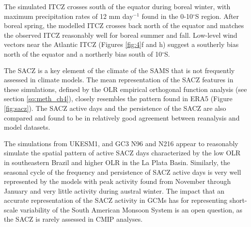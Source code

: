 The simulated ITCZ  crosses south of the equator during boreal winter, with maximum precipitation rates of 12 mm day$^{-1}$ found in the 0-10$^\circ$S region.
After boreal spring, the modelled ITCZ crosses back north of the equator and matches the observed ITCZ reasonably well for boreal summer and fall.
Low-level wind vectors near the Atlantic ITCZ (Figures \ref{fig:4}f and h) suggest a southerly bias north of the equator and a northerly bias south of 10$^\circ$S.


 The SACZ is a key element of the climate of the SAMS \citep{carvalho2004,jorgetti2014,van2015dynamical,zilli2019} that is not frequently assessed in climate models.  
 The mean representation of the SACZ features in these simulations, defined by the OLR empirical orthogonal function analysis (see section \ref{sq:meth_ch4}),  closely resembles the pattern found in ERA5 (Figure \ref{fig:sacz}). The SACZ active days and the persistence of the SACZ are also compared and found to be in relatively good agreement between reanalysis and model datasets.
 
The simulations from UKESM1, and GC3 N96 and N216 appear to reasonably simulate the spatial pattern of active SACZ days characterized by the low OLR in southeastern Brazil and higher OLR in the La Plata Basin. Similarly, the seasonal cycle of the frequency and persistence of SACZ active days is very well represented by the models with peak activity found from November through January and very little activity during austral winter. The impact that an accurate representation of the SACZ activity in GCMs has for representing short-scale variability of the South American Monsoon System is an open question, as the SACZ is rarely assessed in CMIP analyses.

